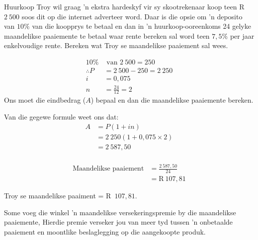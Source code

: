 \begin{wex}{Huurkoop}
{Troy wil graag ’n ekstra hardeskyf vir sy
skootrekenaar koop teen R~$2~500$ soos dit op die internet adverteer word.
Daar is die opsie om ’n deposito van $10\%$ van die koopprys te betaal
en dan in ’n huurkoop-ooreenkoms 24 gelyke maandelikse paaiemente
te betaal waar rente bereken sal word teen $7,5\%$ per jaar enkelvoudige
rente. Bereken wat Troy se maandelikse paaiement sal wees.}
{

\begin{align*}
      10\% &\mbox{ van } 2~500= 250\\
      \therefore P &= 2~500-250 =2~250\\
      i &= 0,075\\
      n &= \frac{24}{12} =2
    \end{align*}
    Ons moet die eindbedrag ($A$) bepaal en dan die maandelikse
paaiemente bereken.

Van die gegewe formule weet ons dat:
    \begin{align*}
A &= P(1 + in)\\
	 &= 2~250(1 + 0,075 \times 2)\\
	  &= 2~587,50\\
    \end{align*}

    \begin{align*}
	\mbox{Maandelikse paaiement} &= \frac{2~587,50}{24}\\
			&= \mbox{R}~107,81
    \end{align*}

    Troy se maandelikse paaiment = R~$107,81$.
}
\end{wex}


Some voeg die winkel 'n maandelikse versekeringspremie by die maandelikse paaiemente, Hierdie premie verseker jou van meer tyd tussen 'n onbetaalde paaiement en moontlike beslaglegging op die aangekoopte produk.


